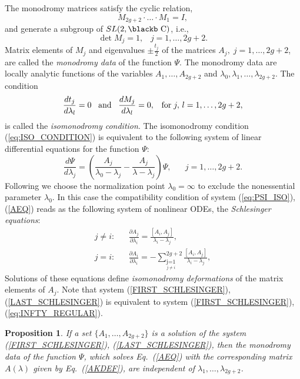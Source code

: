 \documentclass[11pt]{article}
\def\underset#1#2{\mathrel{\mathop{#2}\limits_{#1}}}
\def\Bbb#1{\hbox{\blackb #1}}
\newtheorem{proposition}{Proposition}[section]
\begin{document}
The monodromy matrices satisfy the cyclic relation,
\begin{equation}
  \label{eq:CYCLIC}
M_{2g+2}\cdot\dots\cdot M_1=I,
\end{equation}
and generate a subgroup of $SL(2,\Bbb C)$, i.e.,
\begin{equation}
  \label{eq:DET_M_K}
  \det M_j=1,\;\;\;j=1,\dots,2g+2.
\end{equation}
Matrix elements of $M_j$ and eigenvalues $\pm\frac{t_j}2$ of the matrices
$A_j,\;j=1,\dots,2g+2$, are called the {\it monodromy data} of the function 
$\Psi$. 
The monodromy data are locally analytic functions of the variables 
$A_1,\dots,A_{2g+2}$ and
$\lambda_0,\lambda_1,\dots,\lambda_{2g+2}$. The condition
\begin{equation}
  \label{eq:ISO_CONDITION}
  \frac{dt_j}{d\lambda_l}=0\;\;\;{\rm and}\;\;\;\frac{dM_j}{d\lambda_l}=0,
\;\;\;{\rm for}\;j,\,l=1,\dots,2g+2,
\end{equation}
is called the {\it isomonodromy condition}. The isomonodromy condition 
(\ref{eq:ISO_CONDITION}) is equivalent
to the following system of linear differential equations for the function $\Psi$:
\begin{equation}
  \label{eq:PSI_ISO}
  \frac{d\Psi}{d\lambda_j}=\left(\frac{A_j}{\lambda_0-\lambda_j}
-\frac{A_j}{\lambda-\lambda_j}\right)\Psi,\;\;\;\;\;\;j=1,\dots,2g+2.
\end{equation}
Following \cite{S} we choose the normalization point $\lambda_0=\infty$
to exclude the nonessential parameter $\lambda_0$. In this case the 
compatibility condition of system (\ref{eq:PSI_ISO}), (\ref{AEQ})
reads as the following system of nonlinear ODEs, the 
{\it Schlesinger equations}:
\begin{eqnarray}\label{SCHLESINGER}
j\neq i:& & \frac{\partial A_j}{\partial\lambda_i}=
\frac{[A_i,A_j]}{\lambda_i-\lambda_j},
\label{FIRST_SCHLESINGER}\\
j=i:& &\frac{\partial A_i}{\partial\lambda_i}=
-\sum\limits_{\underset{j\neq i}{j=1}}^{2g+2}
\frac{[A_i,A_j]}{\lambda_i-\lambda_j},
\label{LAST_SCHLESINGER} 
\end{eqnarray}
Solutions of these equations 
define {\it isomonodromy deformations} of the matrix 
elements of $A_j$. Note that system (\ref{FIRST_SCHLESINGER}),
(\ref{LAST_SCHLESINGER}) is equivalent to system (\ref{FIRST_SCHLESINGER}),
(\ref{eq:INFTY_REGULAR}).
\begin{proposition}\label{PROP_SCHLESINGER}
If a set $\{A_1,\dots,A_{2g+2}\}$ is a solution of the system 
{\rm (\ref{FIRST_SCHLESINGER}), (\ref{LAST_SCHLESINGER})}, then 
the monodromy data of the function $\Psi$, which solves 
Eq.~{\rm (\ref{AEQ})} with the corresponding matrix $A(\lambda)$ given by 
Eq.~{\rm (\ref{AKDEF})}, are independent of $\lambda_1,\dots,\lambda_{2g+2}$. 
\end{proposition}
\end{document}
